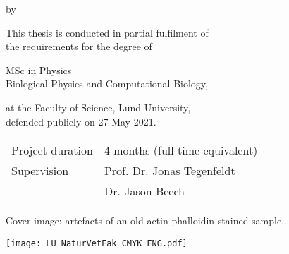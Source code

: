 {
\pagestyle{empty}


\begin{titlepage}
	
	\frutigerfont
	
	\begin{center}

		
		{\Huge \garamondfont \thetitle}
		
		\smallskip
		by
		\bigskip
		
		{\Large \garamondfont \theauthor}
		
		\bigskip
		\bigskip
		
		This thesis is conducted in partial fulfilment of \\
		the requirements for the degree of 
		
		\bigskip
		
		{MSc in Physics} \\
		Biological Physics and Computational Biology,
		
		\bigskip
		
		at the Faculty of Science, Lund University,\\
		defended publicly on 27 May 2021.
		
		
		\vspace{5cm}
		
		\vfill
		\begin{tabular}{ll}
			Project duration & 4 months (full-time equivalent) \\
			Supervision      & Prof. Dr. Jonas Tegenfeldt      \\
			                 & Dr. Jason Beech
		\end{tabular}
	
		\bigskip
	
		Cover image: artefacts of an old actin-phalloidin stained sample.
	
		\vspace{2cm}
		
		\texttt{[image: LU\_NaturVetFak\_CMYK\_ENG.pdf]}
	
	
	\end{center}
\end{titlepage}

%
%
%
%
%
%
%
%

}